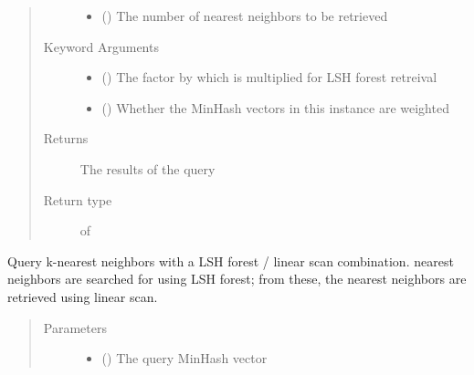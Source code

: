 \documentclass[letterpaper,10pt,english]{sphinxmanual}
\begin{document}
\begin{fulllineitems}
\begin{fulllineitems}
\begin{quote}
\begin{description}
\begin{itemize}
\item {} 
 () \textendash{} The number of nearest neighbors to be retrieved

\end{itemize}

\item[{Keyword Arguments}] \leavevmode\begin{itemize}
\item {} 
 () \textendash{} The factor by which  is multiplied for LSH forest retreival

\item {} 
 () \textendash{} Whether the MinHash vectors in this {\hyperref[\detokenize{documentation:tmap.LSHForest}]{}} instance are weighted

\end{itemize}

\item[{Returns}] \leavevmode
The results of the query

\item[{Return type}] \leavevmode
{} of 

\end{description}\end{quote}

\end{fulllineitems}


\begin{fulllineitems}
\label{\detokenize{documentation:tmap.LSHForest.query_linear_scan_exclude}}
Query k-nearest neighbors with a LSH forest / linear scan combination.  nearest neighbors are searched for using LSH forest; from these, the  nearest neighbors are retrieved using linear scan.
\begin{quote}\begin{description}
\item[{Parameters}] \leavevmode\begin{itemize}
\item {} 
 () \textendash{} The query MinHash vector


\end{itemize}
\end{description}
\end{quote}
\end{fulllineitems}
\end{fulllineitems}
\end{document}
